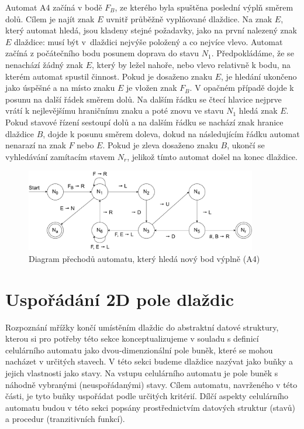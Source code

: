 Automat A4 začíná v bodě $F_B$, ze kterého byla spuštěna poslední výplň směrem dolů. Cílem je najít znak $E$ uvnitř průběžně vyplňované dlaždice. Na znak $E$, který automat hledá, jsou kladeny stejné požadavky, jako na první nalezený znak $E$ dlaždice: musí být v~dlaždici nejvýše položený a co nejvíce vlevo. Automat začíná z počátečního bodu posunem doprava do stavu $N_1$. Předpokládáme, že se nenachází žádný znak $E$, který by ležel nahoře, nebo vlevo relativně k bodu, na kterém automat spustil činnost. Pokud je dosaženo znaku $E$, je hledání ukončeno jako úspěšné a na místo znaku $E$ je vložen znak $F_B$. V opačném případě dojde k posunu na další řádek směrem dolů. Na dalším řádku se čtecí hlavice nejprve vrátí k nejlevějšímu hraničnímu znaku a poté znovu ve stavu $N_1$ hledá znak $E$. Pokud stavové řízení sestoupí dolů a na dalším řádku se nachází znak hranice dlaždice $B$, dojde k posunu směrem doleva, dokud na následujícím řádku automat nenarazí na znak $F$ nebo $E$. Pokud je zleva dosaženo znaku $B$, ukončí se vyhledávání zamítacím stavem $N_r$, jelikož tímto automat došel na konec dlaždice.

\begin{figure}[H]
    \centering
    \includegraphics[width=0.9\textwidth]{obrazky-figures/NovyPocatek.pdf}
    \caption{Diagram přechodů automatu, který hledá nový bod výplně (A4)}
    \label{fig:Novy pocatek}
\end{figure}

\section{Uspořádání 2D pole dlaždic}
\label{section:sortingCA}

Rozpoznání mřížky končí umístěním dlaždic do abstraktní datové struktury, kterou si pro potřeby této sekce konceptualizujeme v souladu s definicí celulárního automatu jako dvou-dimenzionální pole buněk, které se mohou nacházet v určitých stavech. V této sekci budeme dlaždice nazývat jako buňky a jejich vlastnosti jako stavy. Na vstupu celulárního automatu je pole buněk s náhodně vybranými (neuspořádanými) stavy. Cílem automatu, navrženého v této části, je tyto buňky uspořádat podle určitých kritérií. Dílčí aspekty celulárního automatu budou v této sekci popsány prostřednictvím datových struktur (stavů) a procedur (tranzitivních funkcí).

